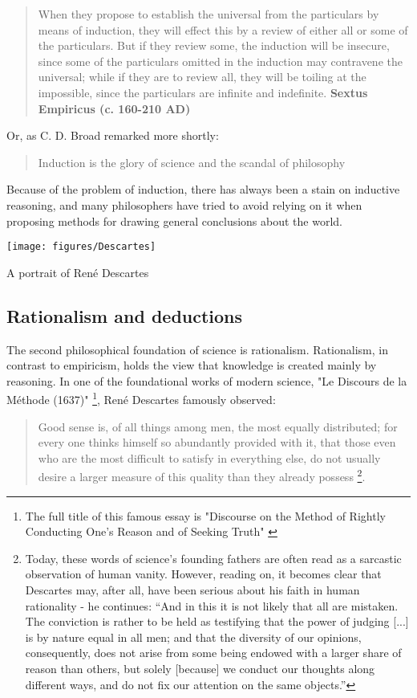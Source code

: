 \documentclass{tufte-book}
\begin{document}
\begin{quote}
When they propose to establish the universal from the particulars by means of induction, they will effect this by a review of either all or some of the particulars. But if they review some, the induction will be insecure, since some of the particulars omitted in the induction may contravene the universal; while if they are to review all, they will be toiling at the impossible, since the particulars are infinite and indefinite. \textbf{Sextus Empiricus (c. 160-210 AD)}
\end{quote}
Or, as C. D. Broad remarked more shortly:
\begin{quote}
Induction is the glory of science and the scandal of philosophy
\end{quote}

Because of the problem of induction, there has always been a stain on inductive reasoning, and many philosophers have tried to avoid relying on it when proposing methods for drawing general conclusions about the world.

\begin{marginfigure}
\begin{center}
\texttt{[image: figures/Descartes]}
\caption{A portrait of René Descartes}
\label{fig: Descartes}
\end{center}
\end{marginfigure}

\subsection{Rationalism and deductions}

The second philosophical foundation of science is rationalism. Rationalism, in contrast to empiricism, holds the view that knowledge is created mainly by reasoning. In one of the foundational works of modern science, "Le Discours de la Méthode (1637)"  \footnote{The full title of this famous essay is "Discourse on the Method of Rightly Conducting One's Reason and of Seeking Truth" \citep{Descartes-DiscourseMethodRightly-1673}}, René Descartes famously observed:

\begin{quote}
Good sense is, of all things among men, the most equally distributed; for every one thinks himself so abundantly provided with it, that those even who are the most difficult to satisfy in everything else, do not usually desire a larger measure of this quality than they already possess \footnote{Today, these words of science's founding fathers are often read as a sarcastic observation of human vanity. However, reading on, it becomes clear that Descartes may, after all, have been serious about his faith in human rationality - he continues: ``And in this it is not likely that all are mistaken. The conviction is rather to be held as testifying that the power of judging [...] is by nature equal in all men; and that the diversity of our opinions, consequently, does not arise from some being endowed with a larger share of reason than others, but solely [because] we conduct our thoughts along different ways, and do not fix our attention on the same objects.''}.
\end{quote}
\end{document}

